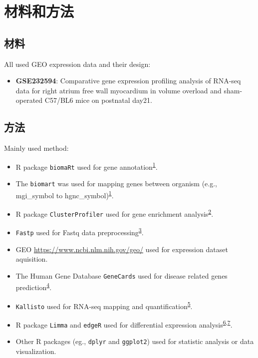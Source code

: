 \documentclass[
]{article}
\providecommand{\tightlist}{%
  \setlength{\itemsep}{0pt}\setlength{\parskip}{0pt}}
\begin{document}
\hypertarget{methods}{%
\section{材料和方法}\label{methods}}

\hypertarget{ux6750ux6599}{%
\subsection{材料}\label{ux6750ux6599}}

All used GEO expression data and their design:

\begin{itemize}
\tightlist
\item
  \textbf{GSE232594}: Comparative gene expression profiling analysis of RNA-seq data for right atrium free wall myocardium in volume overload and sham-operated C57/BL6 mice on postnatal day21.
\end{itemize}

\hypertarget{ux65b9ux6cd5}{%
\subsection{方法}\label{ux65b9ux6cd5}}

Mainly used method:

\begin{itemize}
\tightlist
\item
  R package \texttt{biomaRt} used for gene annotation\textsuperscript{\protect\hyperlink{ref-MappingIdentifDurinc2009}{1}}.
\item
  The \texttt{biomart} was used for mapping genes between organism (e.g., mgi\_symbol to hgnc\_symbol)\textsuperscript{\protect\hyperlink{ref-MappingIdentifDurinc2009}{1}}.
\item
  R package \texttt{ClusterProfiler} used for gene enrichment analysis\textsuperscript{\protect\hyperlink{ref-ClusterprofilerWuTi2021}{2}}.
\item
  \texttt{Fastp} used for Fastq data preprocessing\textsuperscript{\protect\hyperlink{ref-UltrafastOnePChen2023}{3}}.
\item
  GEO \url{https://www.ncbi.nlm.nih.gov/geo/} used for expression dataset aquisition.
\item
  The Human Gene Database \texttt{GeneCards} used for disease related genes prediction\textsuperscript{\protect\hyperlink{ref-TheGenecardsSStelze2016}{4}}.
\item
  \texttt{Kallisto} used for RNA-seq mapping and quantification\textsuperscript{\protect\hyperlink{ref-NearOptimalPrBray2016}{5}}.
\item
  R package \texttt{Limma} and \texttt{edgeR} used for differential expression analysis\textsuperscript{\protect\hyperlink{ref-LimmaPowersDiRitchi2015}{6},\protect\hyperlink{ref-EdgerDifferenChen}{7}}.
\item
  Other R packages (eg., \texttt{dplyr} and \texttt{ggplot2}) used for statistic analysis or data visualization.
\end{itemize}
\end{document}
